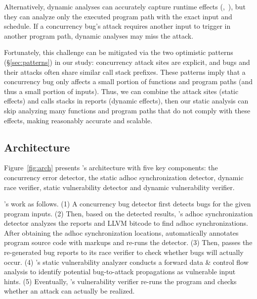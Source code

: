 Alternatively, dynamic analyses can accurately capture runtime effects 
(\eg,~\cite{pres:sosp09,odr:sosp09}), but they can analyze only the executed 
program path with the exact input and schedule. If a concurrency 
bug's attack requires another input to trigger in another program 
path, dynamic analyses may miss the attack.

Fortunately, this challenge can be mitigated via the two optimistic patterns 
(\S\ref{sec:patterns}) in our study: concurrency attack sites are 
explicit, and bugs and their attacks often share similar call stack prefixes.
These patterns imply that a concurrency bug only affects a small portion 
of functions and program paths (and thus a small portion of inputs). Thus, 
we can combine the attack sites (static effects) and calls stacks in reports 
(dynamic effects), then our static analysis can skip analyzing many functions 
and program paths that do not comply with these effects, making \xxx reasonably 
accurate and scalable.

% 


\subsection{\xxx Architecture}\label{sec:arch}

Figure~\ref{fig:arch} presents \xxx's architecture with five key components:
the concurrency error detector, the static adhoc synchronization detector,
dynamic race verifier, static vulnerability detector and dynamic vulnerability
verifier.

\xxx's work as follows. (1) A concurrency bug detector first detects bugs for the 
given program inputs. (2) Then, based on the detected results, 
\xxx's adhoc synchronization detector analyzes the reports and LLVM 
bitcode to find adhoc synchronizations. After obtaining the adhoc 
synchronization locations, \xxx automatically annotates program source code 
with \tsan markups and re-runs the detector. (3) Then, \xxx passes the 
re-generated bug reports to its race verifier to check whether bugs will 
actually occur. (4) \xxx's static vulnerability analyzer conducts a 
forward data \& control flow analysis to identify potential bug-to-attack 
propagations as vulnerable input hints. (5) Eventually, \xxx's vulnerability 
verifier re-runs the program and checks whether an attack can actually be 
realized.

